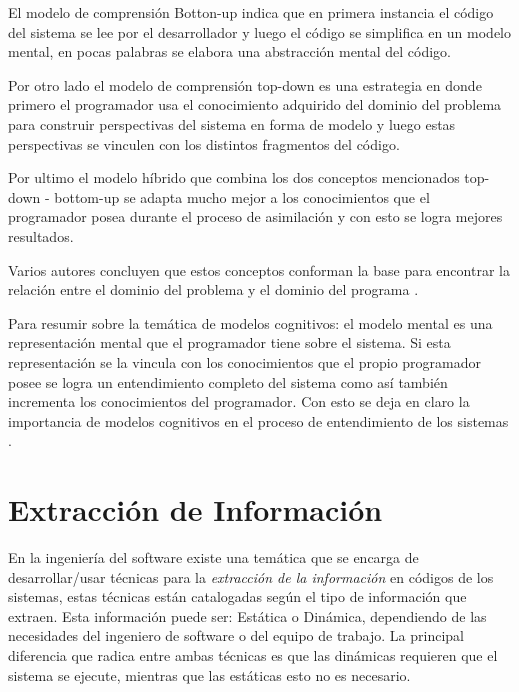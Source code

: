 \documentclass[12pt]{report}
\begin{document}
El modelo de comprensión Botton-up indica que en primera instancia el código del sistema se lee por el desarrollador y luego el código se simplifica en un modelo mental, en pocas palabras se elabora una abstracción mental del código.

Por otro lado el modelo de comprensión top-down es una estrategia en donde primero el programador usa el conocimiento adquirido del dominio del problema para construir perspectivas del sistema en forma de modelo y luego estas perspectivas se vinculen con los distintos fragmentos del código.

Por ultimo el modelo híbrido que combina los dos conceptos mencionados top-down - bottom-up se adapta mucho mejor a los conocimientos que el programador posea durante el proceso de asimilación y con esto se logra mejores resultados.

Varios autores concluyen que estos conceptos conforman la base para encontrar la relación entre el dominio del problema y el dominio del programa \cite{TIE89,MPOB03}.

Para resumir sobre la temática de modelos cognitivos: el modelo mental es una representación mental que el programador tiene sobre el sistema. Si esta representación se la vincula con los conocimientos que el propio programador posee se logra un entendimiento completo del sistema como así también incrementa los conocimientos del programador. Con esto se deja en claro la importancia de modelos cognitivos en el proceso de entendimiento de los sistemas \cite{MBPHRU10}.

\section{Extracción de Información}

En la ingeniería del software existe una temática que se encarga de desarrollar/usar técnicas para la \textit{extracción de la información} en códigos de los sistemas, estas técnicas están catalogadas según el tipo de información que extraen.
Esta información puede ser: Estática o Dinámica, dependiendo de las necesidades del ingeniero de software o del equipo de trabajo. La principal diferencia que radica entre ambas técnicas es que las dinámicas requieren que el sistema se ejecute, mientras que las estáticas esto no es necesario.
\end{document}
